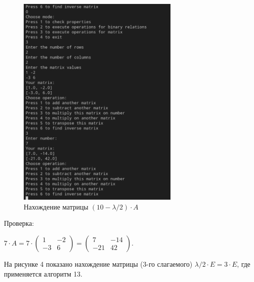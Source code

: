 \documentclass[bachelor, och, labwork]{shiza}
\begin{document}
        \begin{figure}[H]
            \centering
            \includegraphics[width=0.7\textwidth]{photo/3.png}
            \caption{Нахождение матрицы $(10 - \lambda / 2) \cdot A$}
        \end{figure}

        Проверка:
        
        $ 7 \cdot A = 7 \cdot
        \begin{pmatrix}
            1 & -2 \\
            -3 & 6
        \end{pmatrix} =
        \begin{pmatrix}
            7 & -14 \\
            -21 & 42
        \end{pmatrix}$.

        На рисунке 4 показано нахождение матрицы (3-го слагаемого) $\lambda / 2 \cdot E = 3 \cdot E$, где применяется алгоритм 13.
    
\end{document}
